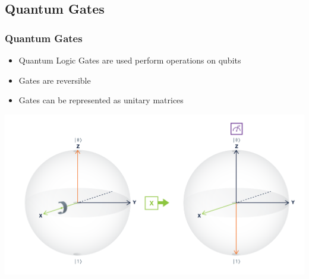 \documentclass[aspectratio=169,11pt,hyperref={colorlinks=true}]{beamer}
\begin{document}
\subsection{Quantum Gates}
\begin{frame}
    \frametitle{Quantum Gates}
    \begin{itemize}  
        \item Quantum Logic Gates are used perform operations on qubits
        \item Gates are reversible
        \item Gates can be represented as unitary matrices
    \end{itemize}
    \centering
    \includegraphics[width=.9\textwidth]{gate_x_bloch.png}
\end{frame}
\end{document}
